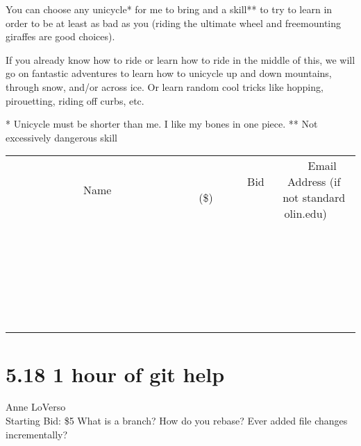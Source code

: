 \documentclass[11pt]{article}
\begin{document}
You can choose any unicycle* for me to bring and a skill** to try to learn in order to be at least as bad as you (riding the ultimate wheel and freemounting giraffes are good choices). 

If you already know how to ride or learn how to ride in the middle of this, we will go on fantastic adventures to learn how to unicycle up and down mountains, through snow, and/or across ice. Or learn random cool tricks like hopping, pirouetting, riding off curbs, etc.

* Unicycle must be shorter than me. I like my bones in one piece.
** Not excessively dangerous skill
\\[6ex]
\begin{tabular}{c c c}
~~~~~~~~~~~~~Name~~~~~~~~~~~~~ & ~~~~~~~~~Bid (\$)~~~~~~~~~  & ~~~Email Address (if not standard olin.edu)~~~\\
 & & \\
\hline
 & & \\
\hline
 & & \\
\hline
 & & \\
\hline
 & & \\
\hline
 & & \\
\hline
 & & \\
\hline
 & & \\
\hline
 & & \\
\hline
 & & \\
\hline
 & & \\
\hline
 & & \\
\hline
 & & \\
\hline
 & & \\
\hline
 & & \\
\hline
 & & \\
\hline
 & & \\
\hline
 & & \\
\hline
 & & \\
\hline
 & & \\
\hline
 & & \\
\hline
 & & \\
\hline
 & & \\
\hline
 & & \\
\hline
 & & \\
\hline
 & & \\
\hline
\end{tabular}
\newpage
\section*{5.18 1 hour of git help}
Anne LoVerso
\\
Starting Bid: \$5
\newline
What is a branch?  How do you rebase?  Ever added file changes incrementally?
\end{document}
